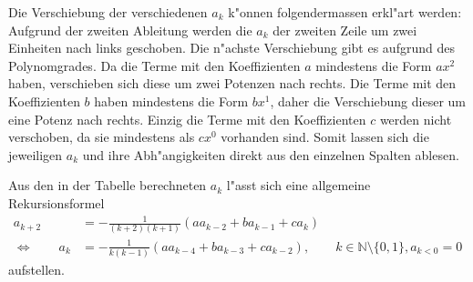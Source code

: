 Die Verschiebung der verschiedenen $a_k$ k"onnen folgendermassen erkl"art 
werden: Aufgrund der zweiten Ableitung werden die $a_k$ der zweiten Zeile um 
zwei Einheiten nach links geschoben. Die n"achste Verschiebung gibt es aufgrund 
des Polynomgrades. Da die Terme mit den Koeffizienten $a$ mindestens die Form 
$ax^2$ haben, verschieben sich diese um zwei Potenzen nach rechts. Die Terme 
mit den Koeffizienten $b$ haben mindestens die Form $bx^1$, daher die 
Verschiebung dieser um eine Potenz nach rechts. Einzig die Terme mit den 
Koeffizienten $c$ werden nicht verschoben, da sie mindestens als $cx^0$ 
vorhanden sind. Somit lassen sich die jeweiligen $a_k$ und ihre Abh"angigkeiten 
direkt aus den einzelnen Spalten ablesen.

Aus den in der Tabelle berechneten $a_k$ l"asst sich eine allgemeine 
Rekursionsformel
\begin{equation*}
	\begin{split}
		a_{k+2} &= -\frac{1}{(k+2)(k+1)} (aa_{k-2}+ba_{k-1}+ca_k) \\
		\Leftrightarrow \qquad
		a_k &= -\frac{1}{k(k-1)} (aa_{k-4}+ba_{k-3}+ca_{k-2}), \qquad k \in 
		\mathbb{N} \setminus \{0, 1\}, a_{k<0} = 0
	\end{split}
\end{equation*}
aufstellen.